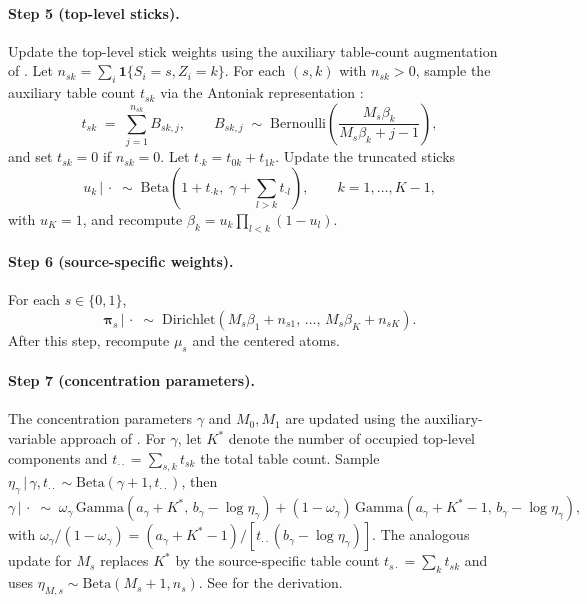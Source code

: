 \documentclass[11pt]{article}
\theoremstyle{plain}
\theoremstyle{definition}
\theoremstyle{remark}
\newcommand{\1}{\mathds{1}}
\newcommand{\given}{\,|\,}
\begin{document}
\paragraph{Step 5 (top-level sticks).} Update the top-level stick weights using the auxiliary table-count augmentation of \citet{teh2006hierarchical}. Let $n_{sk} = \sum_i \mathbf{1}\{S_i = s, Z_i = k\}$. For each $(s, k)$ with $n_{sk} > 0$, sample the auxiliary table count $t_{sk}$ via the Antoniak representation \citep{antoniak1974mixtures}:
\begin{equation}
t_{sk} \;=\; \sum_{j=1}^{n_{sk}} B_{sk,j}, \qquad B_{sk,j} \;\sim\; \mathrm{Bernoulli}\!\left(\frac{M_s \beta_k}{M_s \beta_k + j - 1}\right),
\end{equation}
and set $t_{sk} = 0$ if $n_{sk} = 0$. Let $t_{\cdot k} = t_{0k} + t_{1k}$. Update the truncated sticks
\begin{equation}
u_k \given \cdot \;\sim\; \mathrm{Beta}\!\left(1 + t_{\cdot k},\; \gamma + \sum_{l > k} t_{\cdot l}\right), \qquad k = 1, \ldots, K - 1,
\end{equation}
with $u_K = 1$, and recompute $\beta_k = u_k \prod_{l < k}(1 - u_l)$.

\paragraph{Step 6 (source-specific weights).} For each $s \in \{0, 1\}$,
\begin{equation}
\bm{\pi}_s \given \cdot \;\sim\; \mathrm{Dirichlet}(M_s \beta_1 + n_{s1},\, \ldots,\, M_s \beta_K + n_{sK}).
\end{equation}
After this step, recompute $\mu_s$ and the centered atoms.

\paragraph{Step 7 (concentration parameters).} The concentration parameters $\gamma$ and $M_0, M_1$ are updated using the auxiliary-variable approach of \citet{escobar1995bayesian}. For $\gamma$, let $K^*$ denote the number of occupied top-level components and $t_{\cdot\cdot} = \sum_{s,k} t_{sk}$ the total table count. Sample $\eta_\gamma \given \gamma, t_{\cdot\cdot} \sim \mathrm{Beta}(\gamma + 1, t_{\cdot\cdot})$, then
\begin{equation}
\gamma \given \cdot \;\sim\; \omega_\gamma\, \mathrm{Gamma}(a_\gamma + K^*,\, b_\gamma - \log \eta_\gamma) + (1 - \omega_\gamma)\, \mathrm{Gamma}(a_\gamma + K^* - 1,\, b_\gamma - \log \eta_\gamma),
\end{equation}
with $\omega_\gamma / (1 - \omega_\gamma) = (a_\gamma + K^* - 1) / [t_{\cdot\cdot}(b_\gamma - \log \eta_\gamma)]$. The analogous update for $M_s$ replaces $K^*$ by the source-specific table count $t_{s\cdot} = \sum_k t_{sk}$ and uses $\eta_{M, s} \sim \mathrm{Beta}(M_s + 1, n_s)$. See \citet[Appendix A]{teh2006hierarchical} for the derivation.
\end{document}
